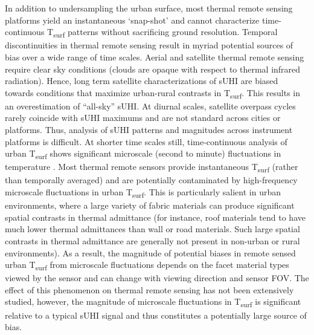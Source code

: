 \begin{bibunit}
In addition to undersampling the urban surface, most thermal remote sensing platforms yield an instantaneous ‘snap-shot’ and cannot characterize time-continuous T\textsubscript{surf} patterns without sacrificing ground resolution. Temporal discontinuities in thermal remote sensing result in myriad potential sources of bias over a wide range of time scales. Aerial and satellite thermal remote sensing require clear sky conditions (clouds are opaque with respect to thermal infrared radiation). Hence, long term satellite characterizations of sUHI are biased towards conditions that maximize urban-rural contrasts in T\textsubscript{surf}. This results in an overestimation of “all-sky” sUHI. At diurnal scales, satellite overpass cycles rarely coincide with sUHI maximums and are not standard across cities or platforms. Thus, analysis of sUHI patterns and magnitudes across instrument platforms is difficult. At shorter time scales still, time-continuous analysis of urban T\textsubscript{surf} shows significant microscale (second to minute) fluctuations in temperature \citep{Christen2012}. Most thermal remote sensors provide instantaneous T\textsubscript{surf} (rather than temporally averaged) and are potentially contaminated by high-frequency microscale fluctuations in urban T\textsubscript{surf}. This is particularly salient in urban environments, where a large variety of fabric materials can produce significant spatial contrasts in thermal admittance (for instance, roof materials tend to have much lower thermal admittances than wall or road materials. Such large spatial contrasts in thermal admittance are generally not present in non-urban or rural environments). As a result, the magnitude of potential biases in remote sensed urban T\textsubscript{surf} from microscale fluctuations depends on the facet material types viewed by the sensor and can change with viewing direction and sensor FOV. The effect of this phenomenon on thermal remote sensing has not been extensively studied, however, the magnitude of microscale fluctuations in T\textsubscript{surf} is significant relative to a typical sUHI signal and thus constitutes a potentially large source of bias.


\end{bibunit}
